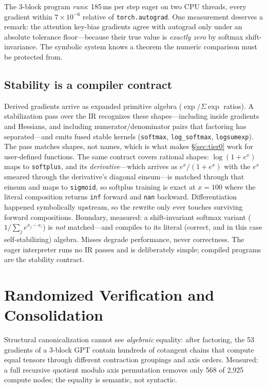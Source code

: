 \documentclass[sigplan,10pt,review]{acmart}
\begin{document}
The 3-block program \emph{runs}: 185\,ms per step eager on two CPU
threads, every gradient within $7\times10^{-6}$ relative of
\texttt{torch.autograd}. One measurement deserves a remark: the
attention key-bias gradients agree with autograd only under an absolute
tolerance floor---because their true value is \emph{exactly zero} by
softmax shift-invariance. The symbolic system knows a theorem the numeric
comparison must be protected from.

\subsection{Stability is a compiler contract}\label{sec:stabilize}

Derived gradients arrive as expanded primitive algebra
($\exp/\Sigma\exp$ ratios). A stabilization pass over the IR recognizes
these shapes---including inside gradients and Hessians, and including
numerator/denominator pairs that factoring has separated---and emits
fused stable kernels (\texttt{softmax}, \texttt{log\_softmax},
\texttt{logsumexp}). The pass matches shapes, not names, which is what
makes \S\ref{sec:tier0} work for user-defined functions. The same
contract covers rational shapes: $\log(1+e^{x})$ maps to
\texttt{softplus}, and its \emph{derivative}---which arrives as
$e^{x}/(1+e^{x})$ with the $e^{x}$ smeared through the derivative's
diagonal einsum---is matched through that einsum and maps to
\texttt{sigmoid}, so softplus training is exact at $x{=}100$ where the
literal composition returns \texttt{inf} forward and \texttt{nan}
backward. Differentiation happened symbolically upstream, so the
rewrite only ever touches surviving forward compositions. Boundary,
measured: a shift-invariant softmax variant
($1/\sum_j e^{x_j - x_i}$) is \emph{not} matched---and compiles to its
literal (correct, and in this case self-stabilizing) algebra. Misses
degrade performance, never correctness. The eager interpreter runs no
IR passes and is deliberately simple; compiled programs are the stability
contract.

\section{Randomized Verification and Consolidation}\label{sec:sz}

Structural canonicalization cannot see \emph{algebraic} equality: after
factoring, the 53 gradients of a 3-block GPT contain hundreds of cotangent
chains that compute equal tensors through different contraction groupings
and axis orders. Measured: a full recursive quotient modulo axis
permutation removes only 568 of 2{,}925 compute nodes; the equality is
semantic, not syntactic.
\end{document}
